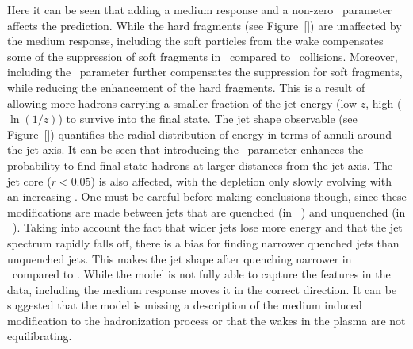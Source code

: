 Here it can be seen that adding a medium response and a non-zero \Lres\ parameter affects the prediction. While the hard fragments (see Figure~\ref{}) are unaffected by the medium response, including the soft particles from the wake compensates some of the suppression of soft fragments in \pbpb\ compared to \pp\ collisions. Moreover, including the \Lres\ parameter further compensates the suppression for soft fragments, while reducing the enhancement of the hard fragments. This is a result of allowing more hadrons carrying a smaller fraction of the jet energy (low $z$, high ($\ln(1/z)$) to survive into the final state. The jet shape observable (see Figure~\ref{}) quantifies the radial distribution of energy in terms of annuli around the jet axis. It can be seen that introducing the \Lres\ parameter enhances the probability to find final state hadrons at larger distances from the jet axis. The jet core ($r < 0.05$) is also affected, with the depletion only slowly evolving with an increasing \Lres. One must be careful before making conclusions though, since these modifications are made between jets that are quenched (in \pbpb\ ) and unquenched (in \pp\ ). Taking into account the fact that wider jets lose more energy and that the jet spectrum rapidly falls off, there is a bias for finding narrower quenched jets than unquenched jets. This makes the jet shape after quenching narrower in \pbpb\ compared to \pp. While the model is not fully able to capture the features in the data, including the medium response moves it in the correct direction. It can be suggested that the model is missing a description of the medium induced modification to the hadronization process or that the wakes in the plasma are not equilibrating.










